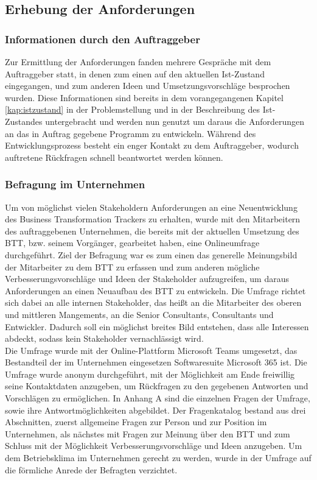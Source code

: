 \subsection{Erhebung der Anforderungen}
\subsubsection{Informationen durch den Auftraggeber}
Zur Ermittlung der Anforderungen fanden mehrere Gespräche mit dem Auftraggeber statt, in denen zum einen auf den aktuellen Ist-Zustand eingegangen, und zum anderen Ideen und Umsetzungsvorschläge besprochen wurden. Diese Informationen sind bereits in dem vorangegangenen Kapitel \ref{kap:istzustand} in der Problemstellung und in der Beschreibung des Ist-Zustandes untergebracht und werden nun genutzt um daraus die Anforderungen an das in Auftrag gegebene Programm zu entwickeln. Während des Entwicklungsprozess besteht ein enger Kontakt zu dem Auftraggeber, wodurch auftretene Rückfragen schnell beantwortet werden können. 

\subsubsection{Befragung im Unternehmen}
\label{kap:Umfrage}
Um von möglichst vielen Stakeholdern Anforderungen an eine Neuentwicklung des Business Transformation Trackers zu erhalten, wurde mit den Mitarbeitern des auftraggebenen Unternehmen, die bereits mit der aktuellen Umsetzung des BTT, bzw. seinem Vorgänger, gearbeitet haben, eine Onlineumfrage durchgeführt. Ziel der Befragung war es zum einen das generelle Meinungsbild der Mitarbeiter zu dem BTT zu erfassen und zum anderen mögliche Verbesserungsvorschläge und Ideen der Stakeholder aufzugreifen, um daraus Anforderungen an einen Neuaufbau des BTT zu entwickeln. Die Umfrage richtet sich dabei an alle internen Stakeholder, das heißt an die Mitarbeiter des oberen und mittleren Mangements, an die Senior Consultants, Consultants und Entwickler. Dadurch soll ein möglichst breites Bild entstehen, dass alle Interessen abdeckt, sodass kein Stakeholder vernachlässigt wird.\\Die Umfrage wurde mit der Online-Plattform \glqq{}Microsoft Teams\grqq{} umgesetzt, das Bestandteil der im Unternehmen eingesetzen Softwaresuite \glqq{}Microsoft 365\grqq{} ist. Die Umfrage wurde anonym durchgeführt, mit der Möglichkeit am Ende freiwillig seine Kontaktdaten anzugeben, um Rückfragen zu den gegebenen Antworten und Vorschlägen zu ermöglichen. In Anhang A sind die einzelnen Fragen der Umfrage, sowie ihre Antwortmöglichkeiten abgebildet. Der Fragenkatalog bestand aus drei Abschnitten, zuerst allgemeine Fragen zur Person und zur Position im Unternehmen, als nächstes mit Fragen zur Meinung über den BTT und zum Schluss mit der Möglichkeit Verbesserungsvorschläge und Ideen anzugeben. Um dem Betriebsklima im Unternehmen gerecht zu werden, wurde in der Umfrage auf die förmliche Anrede der Befragten verzichtet.

